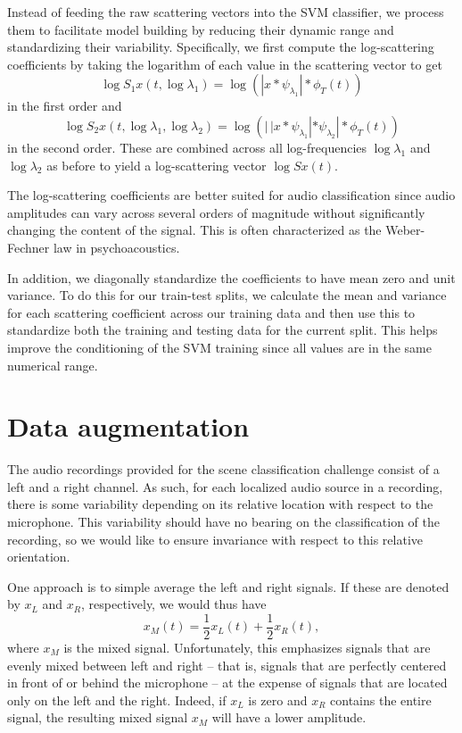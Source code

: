 \documentclass{article}
\newcommand{\lau}{{\lambda_1}}
\newcommand{\lad}{{\lambda_2}}
\begin{document}
\begin{sloppy}
Instead of feeding the raw scattering vectors into the SVM classifier, we process them to facilitate model building by reducing their dynamic range and standardizing their variability. Specifically, we first compute the log-scattering coefficients by taking the logarithm of each value in the scattering vector to get
\begin{equation}
	\log S_1 x(t, \log \lau) = \log \left( | x \ast \psi_\lau | \ast \phi_T(t) \right)
\end{equation}
in the first order and
\begin{equation}
	\log S_2 x(t, \log \lau, \log \lad) = \log \left( |\,| x \ast \psi_\lau | \ast \psi_\lad | \ast \phi_T(t) \right)
\end{equation}
in the second order. These are combined across all log-frequencies $\log \lau$ and $\log \lad$ as before to yield a log-scattering vector $\log Sx(t)$.

The log-scattering coefficients are better suited for audio classification since audio amplitudes can vary across several orders of magnitude without significantly changing the content of the signal. This is often characterized as the Weber-Fechner law in psychoacoustics.

In addition, we diagonally standardize the coefficients to have mean zero and unit variance. To do this for our train-test splits, we calculate the mean and variance for each scattering coefficient across our training data and then use this to standardize both the training and testing data for the current split. This helps improve the conditioning of the SVM training since all values are in the same numerical range.

\section{Data augmentation}

The audio recordings provided for the scene classification challenge consist of a left and a right channel. As such, for each localized audio source in a recording, there is some variability depending on its relative location with respect to the microphone. This variability should have no bearing on the classification of the recording, so we would like to ensure invariance with respect to this relative orientation.

One approach is to simple average the left and right signals. If these are denoted by $x_L$ and $x_R$, respectively, we would thus have
\begin{equation}
	x_M(t) = \frac{1}{2} x_L(t) + \frac{1}{2} x_R(t),
\end{equation}
where $x_M$ is the mixed signal. Unfortunately, this emphasizes signals that are evenly mixed between left and right -- that is, signals that are perfectly centered in front of or behind the microphone -- at the expense of signals that are located only on the left and the right. Indeed, if $x_L$ is zero and $x_R$ contains the entire signal, the resulting mixed signal $x_M$ will have a lower amplitude.


\end{sloppy}
\end{document}
